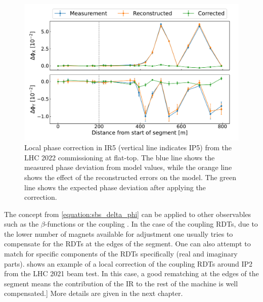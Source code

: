 \begin{figure}[!hbt]
  \centering
  \includegraphics*[width=0.99\linewidth]{Figures/Optics_Measurements_Corrections_at_LHC/sbs_phase_ip5_example.pdf}
  \caption{Local phase correction in IR\num{5} (vertical line indicates IP\num{5}) from the LHC \num{2022} commissioning at flat-top. The \textcolor{mplblue}{blue} line shows the measured phase deviation from model values, while the \textcolor{mplorange}{orange} line shows the effect of the reconstructed errors on the model. The \textcolor{mplgreen}{green} line shows the expected phase deviation after applying the correction.}
  \label{figure:example_sbs_correction}
\end{figure}

The concept from \cref{equation:sbs_delta_phi} can be applied to other observables such as the \(\beta\)-functions or the coupling .
In the case of the coupling \glspl{RDT}, due to the lower number of magnets available for adjustment one usually tries to compensate for the \glspl{RDT} at the edges of the segment.
One can also attempt to match for specific components of the \glspl{RDT} specifically (real and imaginary parts).
 shows an example of a local correction of the coupling \glspl{RDT} around IP\num{2} from the LHC \num{2021} beam test.
In this case, a good rematching at the edges of the segment means the contribution of the \gls{IR} to the rest of the machine is well compensated.]
More details are given in the next chapter.

